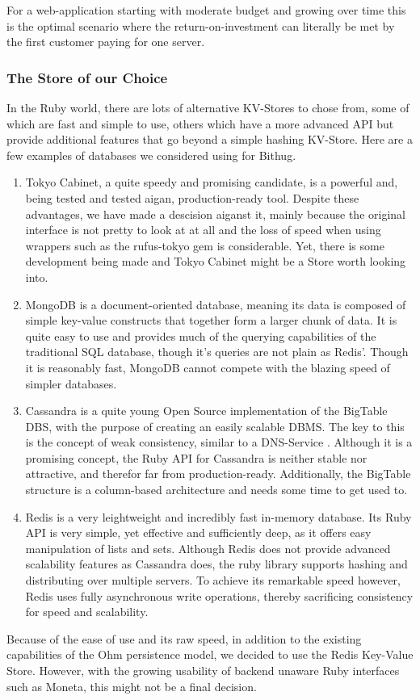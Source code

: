 For a web-application starting with
moderate budget and growing over time this is the optimal scenario where the 
return-on-investment can literally be met by the first customer paying for one 
server.

\subsubsection{The Store of our Choice}
In the Ruby world, there are lots of alternative KV-Stores to chose from, some of which 
are fast and simple to use, others which have a more advanced API but provide 
additional features that go beyond a simple hashing KV-Store. Here are a few 
examples of databases we considered using for Bithug.
\begin{enumerate}
  \item
    Tokyo Cabinet, a quite speedy and promising candidate, is a powerful 
    and, being tested and tested aigan, production-ready\cite{cite mixi} tool. 
    Despite these advantages, we have made a descision aiganst it, mainly because 
    the original interface is not pretty to look at at all and the loss of speed when 
    using wrappers such as the rufus-tokyo gem is considerable. Yet, there is some 
    development being made and Tokyo Cabinet might be a Store worth looking into.
  \item
    MongoDB is a document-oriented database, meaning its data is composed of simple 
    key-value constructs that together form a larger chunk of data. It is quite 
    easy to use and provides much of the querying capabilities of the traditional 
    SQL database, though it's queries are not plain as Redis'. Though it is 
    reasonably fast, MongoDB cannot compete with the blazing speed of simpler 
    databases.\cite{citation needed}
  \item
    Cassandra is a quite young Open Source implementation of the BigTable DBS, \cite{BigTable-Stuff!}
    with the purpose of creating an easily scalable DBMS. The key to this is 
    the concept of weak consistency, similar to a DNS-Service \cite{citation needed}.
    Although it is a promising concept, the Ruby API for Cassandra is neither stable 
    nor attractive, and therefor far from production-ready. Additionally, the 
    BigTable structure is a column-based architecture and needs some time to get 
    used to.
  \item
    Redis is a very leightweight and incredibly fast in-memory database. Its 
    Ruby API is very simple, yet effective and sufficiently deep, as it offers 
    easy manipulation of lists and sets. Although Redis does not provide 
    advanced scalability features as Cassandra does, the ruby library supports 
    hashing and distributing over multiple servers. To achieve its remarkable 
    speed however, Redis uses fully asynchronous write operations, thereby 
    sacrificing consistency for speed and scalability.
\end{enumerate}

Because of the ease of use and its raw speed, in addition to the existing 
capabilities of the Ohm persistence model, we decided to use the Redis 
Key-Value Store. However, with the growing usability of backend unaware Ruby 
interfaces such as Moneta, this might not be a final decision.
